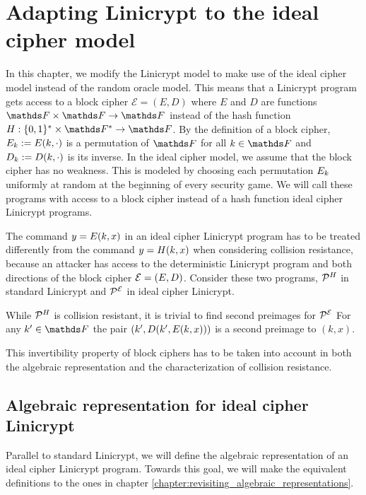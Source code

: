 \chapter{Adapting Linicrypt to the ideal cipher model}

In this chapter, we modify the Linicrypt model to make use of the ideal cipher model instead of the random oracle model.
This means that a Linicrypt program gets access to a block cipher $\mathcal{E} = (E, D)$ where $E$ and $D$ are functions $\F \times \F \to \F$
instead of the hash function $\H : \{0,1\}^* \times \F^* \to \F$.
By the definition of a block cipher,
$E_k := E(k, \cdot)$ is a permutation of $\F$ for all $k \in \F$ and
$D_k := D(k, \cdot)$ is its inverse.
In the ideal cipher model, we assume that the block cipher has no weakness.
This is modeled by choosing each permutation $E_k$ uniformly at random at the beginning of every security game.
We will call these programs with access to a block cipher instead of a hash function ideal cipher Linicrypt programs.

The command $y = E(k, x)$ in an ideal cipher Linicrypt program has to be treated differently from the command $y = H(k, x)$ when considering collision resistance,
because an attacker has access to the deterministic Linicrypt program and both directions of the block cipher $\mathcal{E} = (E, D)$.
Consider these two programs, $\mathcal{P}^H_{\textit{}}$ in standard Linicrypt and $\mathcal{P}^{\mathcal{E}}_{\textit{}}$ in ideal cipher Linicrypt.

\begin{pchstack}[center,space=2cm]
\end{pchstack}
While $\mathcal{P}^H_{\textit{}}$ is collision resistant, it is trivial to find second preimages for $\mathcal{P}^{\mathcal{E}}_{\textit{}}$
For any $k' \in \F$ the pair $(k', D(k', E(k, x)))$ is a second preimage to $(k,x)$.

This invertibility property of block ciphers has to be taken into account
in both the algebraic representation and the characterization of collision resistance.

\section{Algebraic representation for ideal cipher Linicrypt}

Parallel to standard Linicrypt, we will define the algebraic representation of an ideal cipher Linicrypt program.
Towards this goal, we will make the equivalent definitions to the ones in chapter \ref{chapter:revisiting_algebraic_representations}.

